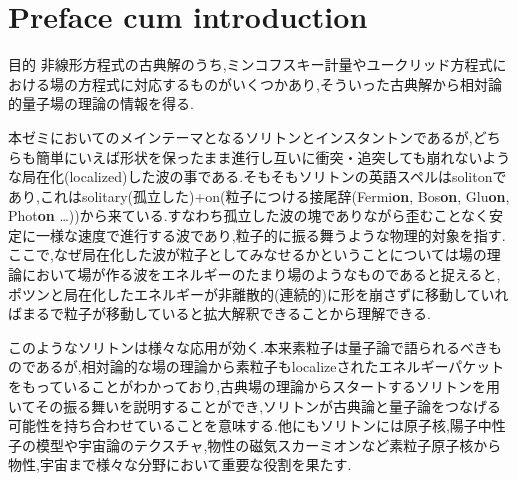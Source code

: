 \documentclass[dvipdfmx,11pt,a4paper]{jsbook}
\begin{document}


\newcommand{\ctext}[1]{\raise0.2ex\hbox{\textcircled{\scriptsize{#1}}}}

\addtolength{\fullwidth}{-26truemm} %
\setlength{\textwidth}{\fullwidth}  %
\setlength{\evensidemargin}{10truemm}   %
\setlength{\oddsidemargin}{10truemm}    %
\chapter{Preface cum introduction}
\begin{itembox}[l]{目的}
    非線形方程式の古典解のうち,ミンコフスキー計量やユークリッド方程式における場の方程式に対応するものがいくつかあり,そういった古典解から相対論的量子場の理論の情報を得る.
\end{itembox}
本ゼミにおいてのメインテーマとなるソリトンとインスタントンであるが,どちらも簡単にいえば形状を保ったまま進行し互いに衝突・追突しても崩れないような局在化(localized)した波の事である.そもそもソリトンの英語スペルはsolitonであり,これはsolitary(孤立した)+on(粒子につける接尾辞(Fermi{\bf on}, Bos{\bf on}, Glu{\bf on}, Phot{\bf on} \dots))から来ている.すなわち孤立した波の塊でありながら歪むことなく安定に一様な速度で進行する波であり,粒子的に振る舞うような物理的対象を指す.ここで,なぜ局在化した波が粒子としてみなせるかということについては場の理論において場が作る波をエネルギーのたまり場のようなものであると捉えると,ポツンと局在化したエネルギーが非離散的(連続的)に形を崩さずに移動していればまるで粒子が移動していると拡大解釈できることから理解できる.

このようなソリトンは様々な応用が効く.本来素粒子は量子論で語られるべきものであるが,相対論的な場の理論から素粒子もlocalizeされたエネルギーパケットをもっていることがわかっており,古典場の理論からスタートするソリトンを用いてその振る舞いを説明することができ,ソリトンが古典論と量子論をつなげる可能性を持ち合わせていることを意味する.他にもソリトンには原子核,陽子中性子の模型や宇宙論のテクスチャ,物性の磁気スカーミオンなど素粒子原子核から物性,宇宙まで様々な分野において重要な役割を果たす.
\end{document}

